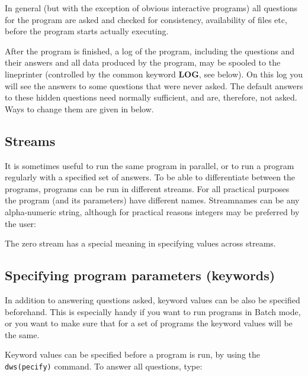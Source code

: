 In general (but with the exception of obvious interactive programs) all
questions for the program are asked and checked for consistency, availability of
files etc, before the program starts actually executing.

After the program is finished, a log of the program, including the questions and
their answers and all data produced by the program, may be spooled to the
lineprinter (controlled by the common \NEWSTAR keyword {\bf LOG}, see below).
On this log you will see the answers to some questions that were never asked.
The default answers to these hidden questions need normally sufficient, 
and are, therefore, not asked.
Ways to change them are given in below.


\subsection{Streams}
\label{common.descr.DWARF-stream}

It is sometimes useful to run the same program in parallel, or to run a program
regularly with a specified set of answers. To be able to differentiate between
the programs, programs can be run in different streams. For all practical
purposes the program (and its parameters) have different names.
Streamnames can be any alpha-numeric string, although for practical reasons
integers may be preferred by the user:


The zero stream has a special meaning in specifying values across streams.


\subsection{Specifying program parameters (keywords)}

In addition to answering questions asked, keyword values can be also be
specified beforehand. 
This is especially handy if you want to run programs in Batch mode,
or you want to make sure that for a set of programs the 
keyword values will be the same.

Keyword values can be specified before a program is run, by using the 
{\tt dws(pecify)} command. To answer all questions, type:



